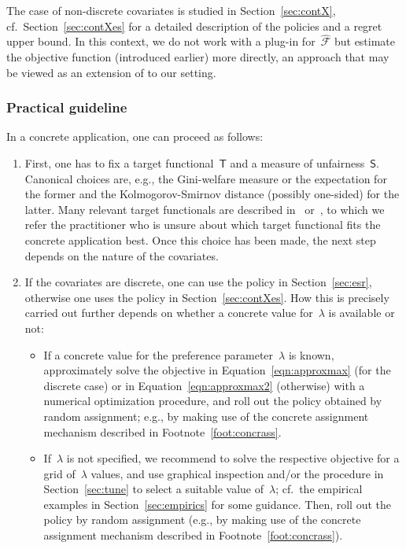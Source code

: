 \documentclass[11pt, a4paper]{article}
\theoremstyle{definition}
\begin{document}
The case of non-discrete covariates is studied in Section~\ref{sec:contX}, cf.~Section~\ref{sec:contXes} for a detailed description of the policies and a regret upper bound. In this context, we do not work with a plug-in for~$\hat{\mathcal{F}}$ but estimate the objective function (introduced earlier) more directly, an approach that may be viewed as an extension of \cite{kitagawa2019equality} to our setting. 

\subsubsection{Practical guideline}

In a concrete application, one can proceed as follows:
\begin{enumerate}
\item First, one has to fix a target functional~$\mathsf{T}$ and a measure of unfairness~$\mathsf{S}$. Canonical choices are, e.g., the Gini-welfare measure or the expectation for the former and the Kolmogorov-Smirnov distance (possibly one-sided) for the latter. Many relevant target functionals are described in~\cite{chakravarty2009} or~\cite{cowell}, to which we refer the practitioner who is unsure about which target functional fits the concrete application best. Once this choice has been made, the next step depends on the nature of the covariates.
\item If the covariates are discrete, one can use the policy in Section~\ref{sec:esr}, otherwise one uses the policy in Section~\ref{sec:contXes}. How this is precisely carried out further depends on whether a concrete value for~$\lambda$ is available or not:
\begin{itemize}
\item If a concrete value for the preference parameter~$\lambda$ is known, approximately solve the objective in Equation~\eqref{eqn:approxmax} (for the discrete case) or in Equation~\eqref{eqn:approxmax2} (otherwise) with a numerical optimization procedure, and roll out the policy obtained by random assignment; e.g., by making use of the concrete assignment mechanism described in Footnote~\ref{foot:concrass}.
\item If~$\lambda$ is not specified, we recommend to solve the respective objective for a grid of~$\lambda$ values, and use graphical inspection and/or the procedure in Section~\ref{sec:tune} to select a suitable value of~$\lambda$; cf.~the empirical examples in Section~\ref{sec:empirics} for some guidance. Then, roll out the policy by random assignment (e.g., by making use of the concrete assignment mechanism described in Footnote~\ref{foot:concrass}).
\end{itemize}
\end{enumerate}    
\end{document}
